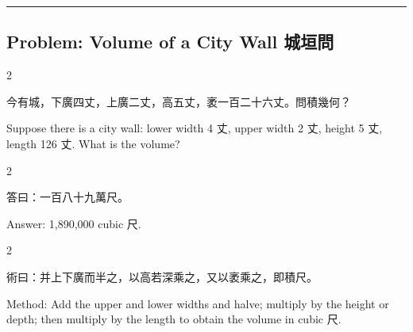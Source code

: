 \documentclass[10pt,a4paper]{article}
\newcommand{\longline}{\noindent\rule{\textwidth}{0.4pt}}
\begin{document}
\vspace{0.3cm}
\longline
\vspace{0.3cm}

\subsection{Problem: Volume of a City Wall 城垣問}

\begin{paracol}{2}

\begin{leftcolumn*}
\begin{problembi}[\textbf{問} · 城垣]
今有城，下廣四丈，上廣二丈，高五丈，袤一百二十六丈。問積幾何？
\end{problembi}
\end{leftcolumn*}

\begin{rightcolumn*}
\begin{problembi}
Suppose there is a city wall: lower width 4 丈, upper width 2 丈, height 5 丈, length 126 丈. What is the volume?
\end{problembi}
\end{rightcolumn*}

\end{paracol}

\begin{paracol}{2}

\begin{leftcolumn*}
\begin{answerbi}[\textbf{答}]
答曰：一百八十九萬尺。
\end{answerbi}
\end{leftcolumn*}

\begin{rightcolumn*}
\begin{answerbi}
Answer: 1,890,000 cubic 尺.
\end{answerbi}
\end{rightcolumn*}

\end{paracol}

\begin{paracol}{2}

\begin{leftcolumn*}
\begin{methodbi}[\textbf{術}]
術曰：并上下廣而半之，以高若深乘之，又以袤乘之，即積尺。
\end{methodbi}
\end{leftcolumn*}

\begin{rightcolumn*}
\begin{methodbi}
Method: Add the upper and lower widths and halve; multiply by the height or depth; then multiply by the length to obtain the volume in cubic 尺.
\end{methodbi}
\end{rightcolumn*}

\end{paracol}
\end{document}
